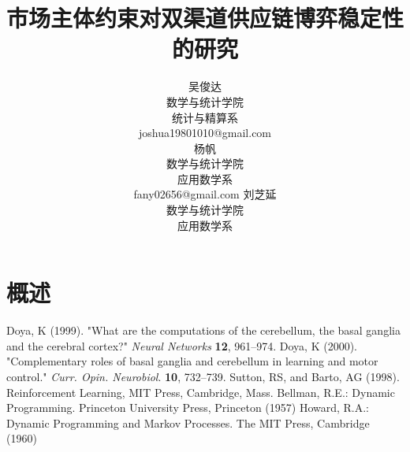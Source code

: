 \documentclass{article}
\title{市场主体约束对双渠道供应链博弈稳定性的研究}
\author{
    吴俊达\\数学与统计学院\\统计与精算系\\joshua19801010@gmail.com\\
    \And
    杨帆\\数学与统计学院\\应用数学系\\fany02656@gmail.com
    \And
    刘芝延\\数学与统计学院\\应用数学系\\
}
\begin{document}
\maketitle
\begin{abstract}
\end{abstract}
\keywords{}
\section{概述}

\begin{thebibliography}{1}
 Doya, K (1999). "What are the computations of the cerebellum, the basal ganglia and the cerebral cortex?" \emph{Neural Networks} \textbf{12}, 961–974.
 Doya, K (2000). "Complementary roles of basal ganglia and cerebellum in learning and motor control." \emph{Curr. Opin. Neurobiol}. \textbf{10}, 732–739.
 Sutton, RS, and Barto, AG (1998). Reinforcement Learning, MIT Press, Cambridge, Mass.
 Bellman, R.E.: Dynamic Programming. Princeton University Press, Princeton (1957)
 Howard, R.A.: Dynamic Programming and Markov Processes. The MIT Press, Cambridge (1960)
\end{thebibliography}
\end{document}
